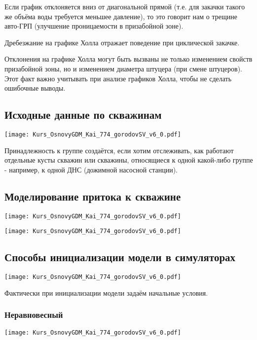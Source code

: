 \documentclass[main.tex]{subfiles}
\begin{document}
Если график отклоняется вниз от диагональной прямой (т.е. для закачки такого же объёма воды требуется меньшее давление), то это говорит нам о трещине  авто-ГРП (улучшение проницаемости в призабойной зоне).

Дребезжание на графике Холла отражает поведение при циклической закачке.

Отклонения на графике Холла могут быть вызваны не только изменением свойств призабойной зоны, но и изменением диаметра штуцера (при смене штуцеров). Этот факт важно учитывать при анализе графиков Холла, чтобы не сделать ошибочные выводы. 

\subsection{Исходные данные по скважинам}

\texttt{[image: Kurs\_OsnovyGDM\_Kai\_774\_gorodovSV\_v6\_0.pdf]}

Принадлежность к группе создаётся, если хотим отслеживать, как работают отдельные кусты скважин или скважины, относящиеся к одной какой-либо группе - например, к одной ДНС (дожимной насосной станции).

\subsection{Моделирование притока к скважине}

\texttt{[image: Kurs\_OsnovyGDM\_Kai\_774\_gorodovSV\_v6\_0.pdf]}

\texttt{[image: Kurs\_OsnovyGDM\_Kai\_774\_gorodovSV\_v6\_0.pdf]}

\subsection{Способы инициализации модели в симуляторах}

\texttt{[image: Kurs\_OsnovyGDM\_Kai\_774\_gorodovSV\_v6\_0.pdf]}

Фактически при инициализации модели задаём начальные условия.

\subsubsection{Неравновесный}

\texttt{[image: Kurs\_OsnovyGDM\_Kai\_774\_gorodovSV\_v6\_0.pdf]}
\end{document}
